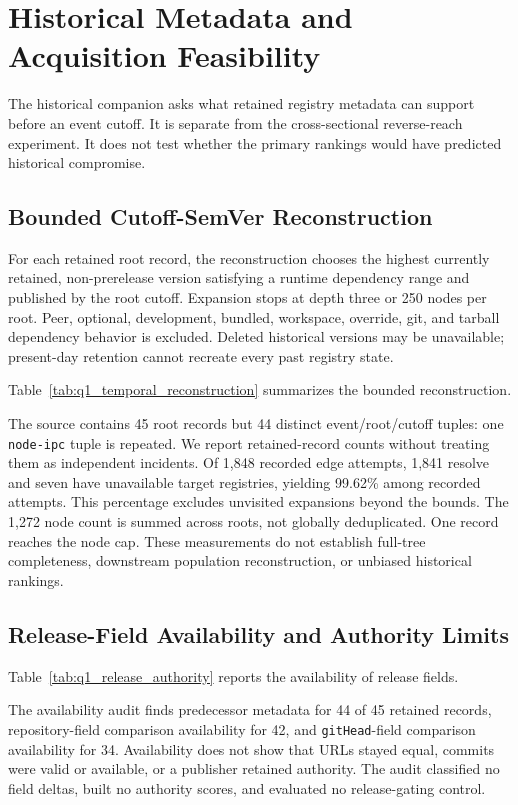 \section{Historical Metadata and Acquisition Feasibility}
\label{sec:temporal_authority}
The historical companion asks what retained registry metadata can support before an event cutoff. It is separate from the cross-sectional reverse-reach experiment. It does not test whether the primary rankings would have predicted historical compromise.

\subsection{Bounded Cutoff-SemVer Reconstruction}
For each retained root record, the reconstruction chooses the highest currently retained, non-prerelease version satisfying a runtime dependency range and published by the root cutoff. Expansion stops at depth three or 250 nodes per root. Peer, optional, development, bundled, workspace, override, git, and tarball dependency behavior is excluded. Deleted historical versions may be unavailable; present-day retention cannot recreate every past registry state.

Table~\ref{tab:q1_temporal_reconstruction} summarizes the bounded reconstruction.


The source contains 45 root records but 44 distinct event/root/cutoff tuples: one \texttt{node-ipc} tuple is repeated. We report retained-record counts without treating them as independent incidents. Of 1,848 recorded edge attempts, 1,841 resolve and seven have unavailable target registries, yielding 99.62\% among recorded attempts. This percentage excludes unvisited expansions beyond the bounds. The 1,272 node count is summed across roots, not globally deduplicated. One record reaches the node cap. These measurements do not establish full-tree completeness, downstream population reconstruction, or unbiased historical rankings.

\subsection{Release-Field Availability and Authority Limits}
Table~\ref{tab:q1_release_authority} reports the availability of release fields.


The availability audit finds predecessor metadata for 44 of 45 retained records, repository-field comparison availability for 42, and \texttt{gitHead}-field comparison availability for 34. Availability does not show that URLs stayed equal, commits were valid or available, or a publisher retained authority. The audit classified no field deltas, built no authority scores, and evaluated no release-gating control.

